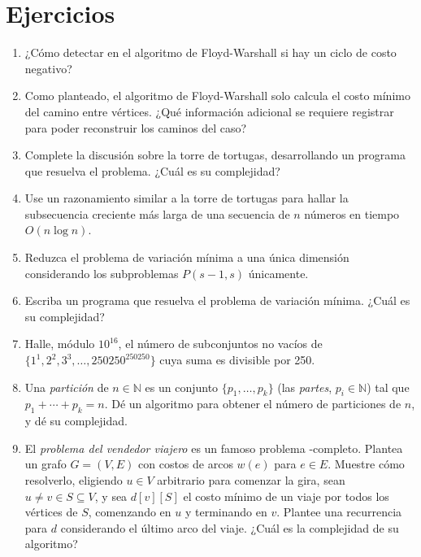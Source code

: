 \section*{Ejercicios}
\label{sec:ejercicios-mas-programacion-dinamica}

  \begin{enumerate}
  \item
    ¿Cómo detectar en el algoritmo de Floyd-Warshall
    si hay un ciclo de costo negativo?
  \item
    Como planteado,
    el algoritmo de Floyd-Warshall solo calcula el costo mínimo
    del camino entre vértices.
    ¿Qué información adicional se requiere registrar
    para poder reconstruir los caminos del caso?
  \item
    Complete la discusión sobre la torre de tortugas,
    desarrollando un programa que resuelva el problema.
    ¿Cuál es su complejidad?
  \item
    Use un razonamiento similar a la torre de tortugas
    para hallar la subsecuencia creciente más larga
    de una secuencia de \(n\) números
    en tiempo \(O(n \log n)\).
  \item
    Reduzca el problema de variación mínima a una única dimensión
    considerando los subproblemas \(P(s - 1, s)\) únicamente.
  \item
    Escriba un programa que resuelva el problema de variación mínima.
    ¿Cuál es su complejidad?
  \item
    Halle,
    módulo \(10^{16}\),
    el número de subconjuntos no vacíos
    de \(\{ 1^1, 2^2, 3^3, \dotsc, 250250^{250250} \}\)
    cuya suma es divisible por \num{250}.
  \item
    Una \emph{partición} de \(n \in \mathbb{N}\)
    es un conjunto \(\{ p_1, \dotsc, p_k \}\)
    (las \emph{partes},
     \(p_i \in \mathbb{N}\))
    tal que \(p_1 + \dotsb + p_k = n\).
    Dé un algoritmo para obtener el número de particiones de \(n\),
    y dé su complejidad.
  \item
    El \emph{problema del vendedor viajero}
    es un famoso problema \NP\nobreakdash-completo.
    Plantea un grafo \(G = (V, E)\)
    con costos de arcos \(w(e)\) para \(e \in E\).
    Muestre cómo resolverlo,
    eligiendo \(u \in V\) arbitrario para comenzar la gira,
    sean \(u \ne v \in S \subseteq V\),
    y sea \(d[v][S]\) el costo mínimo
    de un viaje por todos los vértices de \(S\),
    comenzando en \(u\) y terminando en \(v\).
    Plantee una recurrencia para \(d\) considerando el último arco del viaje.
    ¿Cuál es la complejidad de su algoritmo?
  \end{enumerate}





